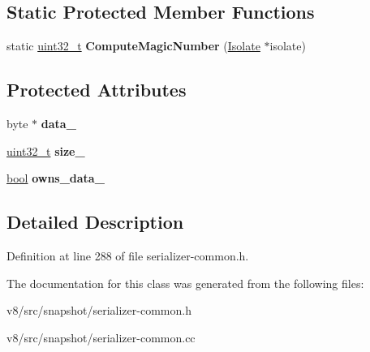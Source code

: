 \subsection*{Static Protected Member Functions}
\begin{DoxyCompactItemize}
\item 
\mbox{\label{classv8_1_1internal_1_1SerializedData_a894b54bbd520853738b90f5693f92511}} 
static \mbox{\hyperlink{classuint32__t}{uint32\+\_\+t}} {\bfseries Compute\+Magic\+Number} (\mbox{\hyperlink{classv8_1_1internal_1_1Isolate}{Isolate}} $\ast$isolate)
\end{DoxyCompactItemize}
\subsection*{Protected Attributes}
\begin{DoxyCompactItemize}
\item 
\mbox{\label{classv8_1_1internal_1_1SerializedData_a64749942df326ecb95dde8af526157ee}} 
byte $\ast$ {\bfseries data\+\_\+}
\item 
\mbox{\label{classv8_1_1internal_1_1SerializedData_ad4e6f69ddd63b35ed0efed21d0f0fb02}} 
\mbox{\hyperlink{classuint32__t}{uint32\+\_\+t}} {\bfseries size\+\_\+}
\item 
\mbox{\label{classv8_1_1internal_1_1SerializedData_a755ae910320bb00afc3721c8e270560f}} 
\mbox{\hyperlink{classbool}{bool}} {\bfseries owns\+\_\+data\+\_\+}
\end{DoxyCompactItemize}


\subsection{Detailed Description}


Definition at line 288 of file serializer-\/common.\+h.



The documentation for this class was generated from the following files\+:\begin{DoxyCompactItemize}
\item 
v8/src/snapshot/serializer-\/common.\+h\item 
v8/src/snapshot/serializer-\/common.\+cc\end{DoxyCompactItemize}
